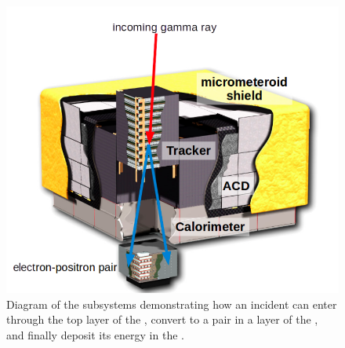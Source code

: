 \begin{figure}[ht!]
	\centering
	\includegraphics[width=1.0\columnwidth]{Figures/latGuts.png}
	\caption[Diagram of the three primary LAT subsystems]{Diagram of the \lat{} subsystems demonstrating how an incident \gam{} can enter through the top layer of the \acd{}, convert to a \ee{} pair in a layer of the \tkr{}, and finally deposit its energy in the \calo{}.}
	\label{fig:latGuts}
\end{figure}
 
